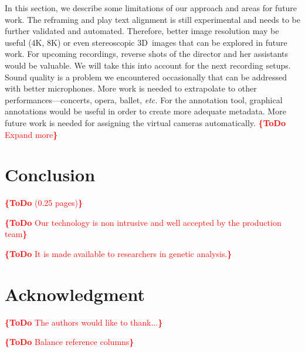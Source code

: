 \documentclass[conference]{IEEEtran}
\newcommand{\todo}[1]{\noindent\textcolor{red}{{\bf \{ToDo} #1{\bf \}}}}
\begin{document}
In this section, we describe some limitations of our approach and areas for future work.
The reframing and play text alignment is still experimental
and needs to be further validated and automated.
Therefore, better image resolution may be useful (4K, 8K)
or even stereoscopic 3D~images that can be explored in future work.
For upcoming recordings, reverse shots of the director and her assistants would be valuable.
We will take this into account for the next recording setups.
Sound quality is a problem we encountered occasionally that can be addressed with better microphones.
More work is needed to extrapolate to other performances---concerts, opera, ballet, \emph{etc.}
For the annotation tool, graphical annotations would be useful
in order to create more adequate metadata.
More future work is needed for assigning the virtual cameras automatically.
\todo{Expand more}

\section{Conclusion}
\todo{(0.25 pages)}

\todo{Our technology is non intrusive and well accepted by the production team}

\todo{It is made available to researchers in genetic analysis.}

 

\section*{Acknowledgment}

\todo{The authors would like to thank...}

\todo{Balance reference columns}







\end{document}
